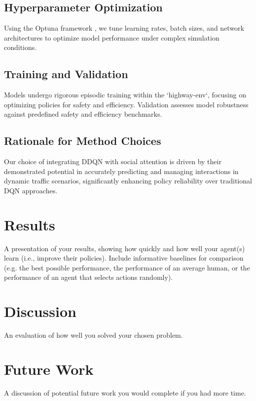 \documentclass{article}
\begin{document}
\subsection{Hyperparameter Optimization}
Using the Optuna framework \cite{optuna_2019}, we tune learning rates, batch sizes, and network architectures to optimize model performance under complex simulation conditions.

\subsection{Training and Validation}
Models undergo rigorous episodic training within the `highway-env`, focusing on optimizing policies for safety and efficiency. Validation assesses model robustness against predefined safety and efficiency benchmarks.

\subsection{Rationale for Method Choices}
Our choice of integrating DDQN with social attention is driven by their demonstrated potential in accurately predicting and managing interactions in dynamic traffic scenarios, significantly enhancing policy reliability over traditional DQN approaches.




\section{Results}

A presentation of your results, showing how quickly and how well your agent(s) learn (i.e., improve their policies). Include informative baselines for comparison (e.g. the best possible performance, the performance of an average human, or the performance of an agent that selects actions randomly).

\section{Discussion}

An evaluation of how well you solved your chosen problem.

\section{Future Work}

A discussion of potential future work you would complete if you had more time.
\end{document}
